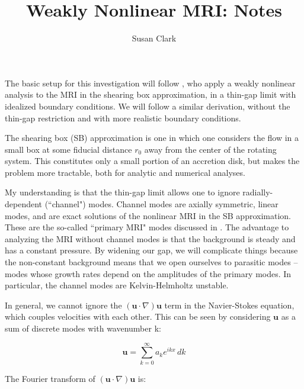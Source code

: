 \documentclass[letterpaper,12pt]{article}
\begin{document}
\pagestyle{plain}

\title{Weakly Nonlinear MRI: Notes}
\author{Susan Clark}
\maketitle
\vspace{0.2cm}

The basic setup for this investigation will follow \citet{Umurhan:2007dz}, who apply a weakly nonlinear analysis to the MRI in the shearing box approximation, in a thin-gap limit with idealized boundary conditions. We will follow a similar derivation, without the thin-gap restriction and with more realistic boundary conditions.

The shearing box (SB) approximation is one in which one considers the flow in a small box at some fiducial distance ${r_0}$ away from the center of the rotating system. This constitutes only a small portion of an accretion disk, but makes the problem more tractable, both for analytic and numerical analyses. 

My understanding is that the thin-gap limit allows one to ignore radially-dependent (``channel") modes. Channel modes are axially symmetric, linear modes, and are exact solutions of the nonlinear MRI in the SB approximation. These are the so-called ``primary MRI" modes discussed in \citet{Pessah:2010ic}. The advantage to analyzing the MRI without channel modes is that the background is steady and has a constant pressure. By widening our gap, we will complicate things because the non-constant background means that we open ourselves to parasitic modes -- modes whose growth rates depend on the amplitudes of the primary modes. In particular, the channel modes are Kelvin-Helmholtz unstable. 

In general, we cannot ignore the $\left(\textbf{u} \cdot \nabla \right) \textbf{u}$ term in the Navier-Stokes equation, which couples velocities with each other. %
This can be seen by considering $\textbf{u}$ as a sum of discrete modes with wavenumber k:

\begin{equation}
\textbf{u} = \sum\limits_{k = 0}^{\infty}a_k e^{ikx} \, dk
\end{equation}

\noindent The Fourier transform of $\left(\textbf{u} \cdot \nabla \right) \textbf{u}$ is:
\end{document}
